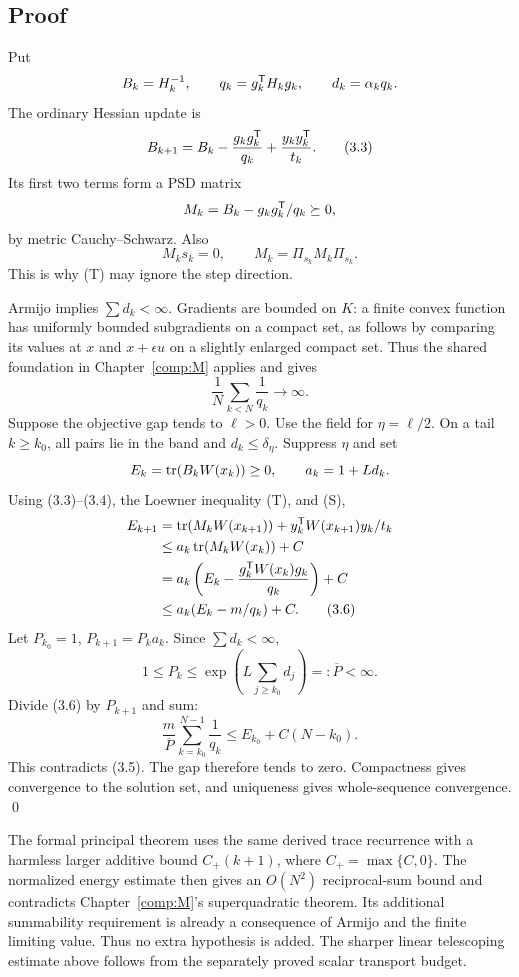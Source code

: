 \subsection{Proof}
Put
\[
 B_k=H_k^{-1},\qquad q_k=g_k^{\mathsf T} H_kg_k,\qquad
 d_k=\alpha_kq_k.
\]
The ordinary Hessian update is
\begin{equation}
 B_{k+1}=B_k-\frac{g_kg_k^{\mathsf T}}{q_k}+\frac{y_ky_k^{\mathsf T}}{t_k}. \tag{3.3}
\end{equation}
Its first two terms form a PSD matrix
\[
 M_k=B_k-g_kg_k^{\mathsf T}/q_k\succeq0,
\]
by metric Cauchy--Schwarz. Also
\begin{equation}
 M_ks_k=0,\qquad M_k=\Pi_{s_k}M_k\Pi_{s_k}. \tag{3.4}
\end{equation}
This is why (T) may ignore the step direction.

Armijo implies $\sum d_k<\infty$. Gradients are bounded on $K$: a finite convex function has uniformly bounded subgradients on a compact set, as follows by comparing its values at $x$ and $x+\epsilon u$ on a slightly enlarged compact set. Thus the shared foundation in Chapter~\ref{comp:M} applies and gives
\begin{equation}
 \frac1N\sum_{k<N}\frac1{q_k}\longrightarrow\infty. \tag{3.5}
\end{equation}
Suppose the objective gap tends to $\ell>0$. Use the field for $\eta=\ell/2$. On a tail $k\ge k_0$, all pairs lie in the band and $d_k\le\delta_\eta$. Suppress $\eta$ and set
\[
 E_k=\operatorname{tr}(B_kW(x_k))\ge0,\qquad a_k=1+L d_k.
\]
Using (3.3)--(3.4), the Loewner inequality (T), and (S),
\begin{align}
 E_{k+1}
 &=\operatorname{tr}(M_kW(x_{k+1}))+y_k^{\mathsf T} W(x_{k+1})y_k/t_k\notag\\
 &\le a_k\operatorname{tr}(M_kW(x_k))+C\notag\\
 &=a_k\left(E_k-\frac{g_k^{\mathsf T} W(x_k)g_k}{q_k}\right)+C\notag\\
 &\le a_k(E_k-m/q_k)+C. \tag{3.6}
\end{align}
Let $P_{k_0}=1$, $P_{k+1}=P_ka_k$. Since $\sum d_k<\infty$,
\[
 1\le P_k\le \exp\left(L\sum_{j\ge k_0}d_j\right)=:\overline P<\infty.
\]
Divide (3.6) by $P_{k+1}$ and sum:
\[
 \frac m{\overline P}\sum_{k=k_0}^{N-1}\frac1{q_k}
 \le E_{k_0}+C(N-k_0).
\]
This contradicts (3.5). The gap therefore tends to zero. Compactness gives convergence to the solution set, and uniqueness gives whole-sequence convergence. \qed

The formal principal theorem uses the same derived trace recurrence with a harmless larger additive bound $C_+(k+1)$, where $C_+=\max\{C,0\}$. The normalized energy estimate then gives an $O(N^2)$ reciprocal-sum bound and contradicts Chapter~\ref{comp:M}'s superquadratic theorem. Its additional summability requirement is already a consequence of Armijo and the finite limiting value. Thus no extra hypothesis is added. The sharper linear telescoping estimate above follows from the separately proved scalar transport budget.


